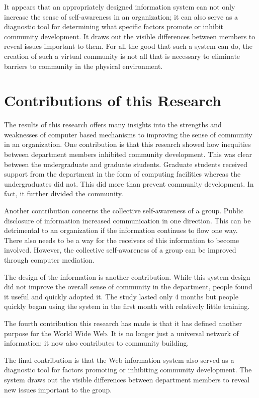 It appears that an appropriately designed information system can not only
increase the sense of self-awareness in an organization; it can also serve as a
diagnostic tool for determining what specific factors promote or inhibit
community development.  It draws out the visible differences between members to
reveal issues important to them.  For all the good that such a system can do,
the creation of such a virtual community is not all that is necessary to
eliminate barriers to community in the physical environment.

\section{Contributions of this Research}
The results of this research offers many insights into the strengths and
weaknesses of computer based mechanisms to improving the sense of community in
an organization.  One contribution is that this research showed how inequities
between department members inhibited community development.  This was clear
between the undergraduate and graduate students.  Graduate students received
support from the department in the form of computing facilities whereas the
undergraduates did not.  This did more than prevent community development.  In
fact, it further divided the community.

Another contribution concerns the collective self-awareness of a group.  Public
disclosure of information increased communication in one direction.  This can
be detrimental to an organization if the information continues to flow one way.
There also needs to be a way for the receivers of this information to become
involved.  However, the collective self-awareness of a group can be improved
through computer mediation.

The design of the information is another contribution.  While this system
design did not improve the overall sense of community in the department, people
found it useful and quickly adopted it.  The study lasted only 4 months but
people quickly began using the system in the first month with relatively little
training.

The fourth contribution this research has made is that it has defined another
purpose for the World Wide Web.  It is no longer just a universal network of
information; it now also contributes to community building.

The final contribution is that the Web information system also served as a
diagnostic tool for factors promoting or inhibiting community development.  The
system draws out the visible differences between department members to reveal
new issues important to the group.


